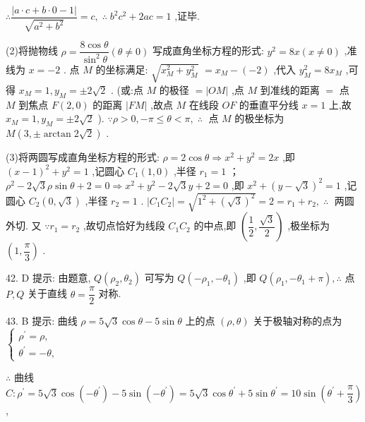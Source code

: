 $\therefore \dfrac{\left| a \cdot  c + b \cdot  0 - 1\right| }{\sqrt{{a}^{2} + {b}^{2}}} = c,\;\therefore \;{b}^{2}{c}^{2} + {2ac} = 1$ ,证毕.

(2)将抛物线 $\rho  = \dfrac{8\cos \theta }{{\sin }^{2}\theta }\left( {\theta  \neq  0}\right)$ 写成直角坐标方程的形式: ${y}^{2} = {8x}\left( {x \neq  0}\right)$ ,准线为 $x =  - 2$ . 点 $M$ 的坐标满足: $\sqrt{{x}_{M}^{2} + {y}_{M}^{2}}$  $= {x}_{M} - \left( {-2}\right)$ ,代入 ${y}_{M}^{2} = 8{x}_{M}$ ,可得 ${x}_{M} = 1,{y}_{M} =  \pm  2\sqrt{2}$ . (或:点 $M$ 的极径 $= \left| {OM}\right|$ ,点 $M$ 到准线的距离 $=$ 点 $M$ 到焦点 $F\left( {2,0}\right)$ 的距离 $\left| {FM}\right|$ ,故点 $M$ 在线段 ${OF}$ 的垂直平分线 $x = 1$ 上,故 ${x}_{M} = 1,{y}_{M} =  \pm  2\sqrt{2}$ ). $\because \rho  > 0, - \pi  \leq  \theta  < \pi ,\;\therefore \;$ 点 $M$ 的极坐标为 $M\left( {3, \pm  \arctan 2\sqrt{2}}\right)$ .

(3)将两圆写成直角坐标方程的形式: $\rho  = 2\cos \theta  \Rightarrow  {x}^{2} + {y}^{2} = {2x}$ ,即 ${\left( x - 1\right) }^{2} + {y}^{2} = 1$ ,记圆心 ${C}_{1}\left( {1,0}\right)$ ,半径 ${r}_{1} = 1$ ； ${\rho }^{2} - 2\sqrt{3}\rho \sin \theta  + 2 = 0 \Rightarrow  {x}^{2} + {y}^{2} - 2\sqrt{3}y + 2 = 0$ ,即 ${x}^{2} + {\left( y - \sqrt{3}\right) }^{2} = 1$ ,记圆心 ${C}_{2}\left( {0,\sqrt{3}}\right)$ ,半径 ${r}_{2} = 1$ . $\left| {{C}_{1}{C}_{2}}\right|  = \sqrt{{1}^{2} + {\left( \sqrt{3}\right) }^{2}} = 2 = {r}_{1} + {r}_{2},\;\therefore \;$ 两圆外切. 又 $\because {r}_{1} = {r}_{2}$ ,故切点恰好为线段 ${C}_{1}{C}_{2}$ 的中点,即 $\left( {\dfrac{1}{2},\dfrac{\sqrt{3}}{2}}\right)$ ,极坐标为 $\left( {1,\dfrac{\pi }{3}}\right)$ .

42. D 提示: 由题意, $Q\left( {{\rho }_{2},{\theta }_{2}}\right)$ 可写为 $Q\left( {-{\rho }_{1}, - {\theta }_{1}}\right)$ ,即 $Q\left( {{\rho }_{1}, - {\theta }_{1} + \pi }\right) ,\therefore$ 点 $P,Q$ 关于直线 $\theta  = \dfrac{\pi }{2}$ 对称.

43. B 提示: 曲线 $\rho  = 5\sqrt{3}\cos \theta  - 5\sin \theta$ 上的点 $\left( {\rho ,\theta }\right)$ 关于极轴对称的点为 $\left\{  \begin{array}{l} {\rho }^{\prime } = \rho , \\  {\theta }^{\prime } =  - \theta , \end{array}\right.$

$\therefore$ 曲线 $C : {\rho }^{\prime } = 5\sqrt{3}\cos \left( {-{\theta }^{\prime }}\right)  - 5\sin \left( {-{\theta }^{\prime }}\right)  = 5\sqrt{3}\cos {\theta }^{\prime } + 5\sin {\theta }^{\prime } = {10}\sin \left( {{\theta }^{\prime } + \dfrac{\pi }{3}}\right)$ ,

